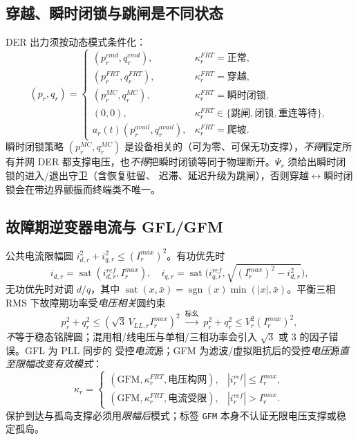 \subsection{穿越、瞬时闭锁与跳闸是不同状态}\label{sec:rel-pf-output}
DER 出力须按动态模式条件化：
\begin{equation}
 (p_r,q_r)=\begin{cases}
 (p_r^{cmd},q_r^{cmd}),&\kappa_r^{FRT}=\text{正常},\\
 (p_r^{FRT},q_r^{FRT}),&\kappa_r^{FRT}=\text{穿越},\\
 (p_r^{MC},q_r^{MC}),&\kappa_r^{FRT}=\text{瞬时闭锁},\\
 (0,0),&\kappa_r^{FRT}\in\{\text{跳闸},\text{闭锁},\text{重连等待}\},\\
 a_r(t)(p_r^{avail},q_r^{avail}),&\kappa_r^{FRT}=\text{爬坡}.
 \end{cases}
\end{equation}
瞬时闭锁策略 $(p_r^{MC},q_r^{MC})$ 是设备相关的（可为零、可保无功支撑），\emph{不得}假定所有并网 DER
都支撑电压，也\emph{不得}把瞬时闭锁等同于物理断开。$\Psi_r$ 须给出瞬时闭锁的进入/退出守卫（含恢复驻留、
迟滞、延迟升级为跳闸），否则穿越$\leftrightarrow$瞬时闭锁会在带边界颤振而终端类不唯一。

\subsection{故障期逆变器电流与 GFL/GFM}\label{sec:rel-pf-current}
公共电流限幅圆 $i_{d,r}^2+i_{q,r}^2\le(I_r^{max})^2$。有功优先时
\begin{equation}
 i_{d,r}=\operatorname{sat}(i_{d,r}^{ref},I_r^{max}),\quad
 i_{q,r}=\operatorname{sat}\!\Big(i_{q,r}^{ref},\sqrt{(I_r^{max})^2-i_{d,r}^2}\Big),
\end{equation}
无功优先时对调 $d/q$，其中 $\operatorname{sat}(x,\bar x)=\operatorname{sgn}(x)\min(|x|,\bar x)$。平衡三相
RMS 下故障期功率受\emph{电压相关}圆约束
\begin{equation}
 p_r^2+q_r^2\le(\sqrt3\,V_{LL,r}I_r^{max})^2\ \xrightarrow{\text{标幺}}\ p_r^2+q_r^2\le V_r^2(I_r^{max})^2,
\end{equation}
\emph{不}等于稳态铭牌圆；混用相/线电压与单相/三相功率会引入 $\sqrt3$ 或 $3$ 的因子错误。GFL 为 PLL 同步的
受控\emph{电流}源；GFM 为滤波/虚拟阻抗后的受控\emph{电压}源\emph{直至限幅改变有效模式}：
\begin{equation}
 \kappa_r=\begin{cases}(\mathrm{GFM},\kappa_r^{FRT},\text{电压构网}),&|i_r^{ref}|\le I_r^{max},\\
 (\mathrm{GFM},\kappa_r^{FRT},\text{电流受限}),&|i_r^{ref}|>I_r^{max}.\end{cases}
\end{equation}
保护到达与孤岛支撑必须用\emph{限幅后}模式；标签 \texttt{GFM} 本身不认证无限电压支撑或稳定孤岛。

